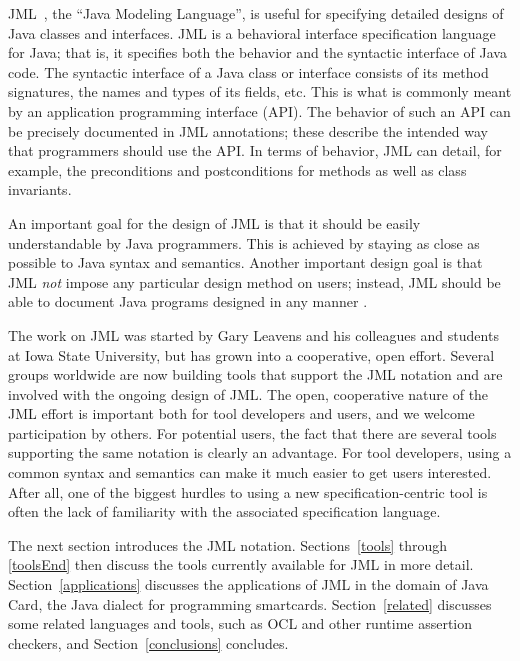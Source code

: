 
JML~\cite{Leavens-Baker-Ruby99b,Leavens-Baker-Ruby03}, the
``Java Modeling Language'', is useful for specifying detailed
designs of Java classes and interfaces.  JML is a behavioral interface
specification language for Java; that is, it specifies both the behavior
and the syntactic interface of Java code.  The syntactic interface of
a Java class or interface consists of its method signatures,
the names and types of its fields, etc.
This is what is commonly meant by an application programming
interface (API).
The behavior of such an API can be precisely documented in JML annotations;
these describe the intended way that programmers should
use the API.  In terms of behavior, JML can detail, for example, the
preconditions and postconditions for methods as well as class
invariants.

An important goal for the design of JML is that it should be easily
understandable by Java programmers. This is achieved by staying as
close as possible to Java syntax and semantics.  Another important
design goal is that JML {\em not} impose any particular design method
on users; instead, JML should be able to document Java programs
designed in any manner \cite{Leavens-Baker-Ruby03}.

The work on JML was started by Gary Leavens and his colleagues and
students at Iowa State University, but has grown into a cooperative,
open effort.  Several groups worldwide are now building tools that
support the JML notation and are involved with the ongoing design of
JML\@.  The open, cooperative nature of the JML effort is important
both for tool developers and users, and we welcome participation by
others.  For potential users, the fact that there are several tools
supporting the same notation is clearly an advantage.  For tool
developers, using a common syntax and semantics can make it much
easier to get users interested. After all, one of the biggest hurdles
to using a new specification-centric tool is often the lack of
familiarity with the associated specification language.

\medskip

The next section introduces the JML notation.  Sections~\ref{tools}
through \ref{toolsEnd} then discuss the tools currently available for
JML in more detail.  Section~\ref{applications} discusses the
applications of JML in the domain of Java Card, the Java dialect for
programming smartcards.  Section~\ref{related} discusses some related
languages and tools, such as OCL and other runtime assertion checkers,
and Section~\ref{conclusions} concludes.

